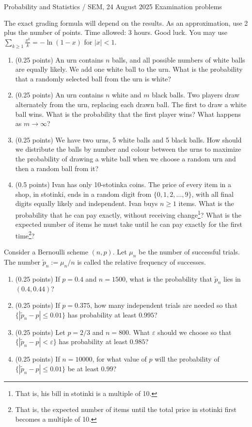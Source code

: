 \documentclass[a4paper]{report}
\begin{document}
\noindent Probability and Statistics / SEM, 24 August 2025 \hfill Examination problems
\hrulefill
\begin{it}
The exact grading formula will depend on the results. As an approximation, use 2 plus the number of points. Time allowed: 3 hours. Good luck.
You may use $\sum_{k\geq1}\frac{x^k}{k}=-\ln(1-x)$ for $|x|<1$.
\end{it}
\begin{problem}
\begin{enumerate}
\item (0.25 points) An urn contains $n$ balls, and all possible numbers of white balls are equally likely. We add one white ball to the urn. What is the probability that a randomly selected ball from the urn is white?
\item (0.25 points) An urn contains $n$ white and $m$ black balls. Two players draw alternately from the urn, replacing each drawn ball. The first to draw a white ball wins. What is the probability that the first player wins? What happens as $m\to\infty$?
\item (0.25 points) We have two urns, 5 white balls and 5 black balls. How should we distribute the balls by number and colour between the urns to maximize the probability of drawing a white ball when we choose a random urn and then a random ball from it?
\item (0.5 points) Ivan has only 10-stotinka coins. The price of every item in a shop, in stotinki, ends in a random digit from $\{0,1,2,\dots,9\}$, with all final digits equally likely and independent. Ivan buys $n\geq1$ items. What is the probability that he can pay exactly, without receiving change\footnote{That is, his bill in stotinki is a multiple of 10.}? What is the expected number of items he must take until he can pay exactly for the first time\footnote{That is, the expected number of items until the total price in stotinki first becomes a multiple of 10.}?
\end{enumerate}
\end{problem}
\begin{problem}
Consider a Bernoulli scheme $(n,p)$. Let $\mu_n$ be the number of successful trials. The number $\tilde p_n:=\mu_n/n$ is called the relative frequency of successes.
\begin{enumerate}
\item (0.25 points) If $p=0.4$ and $n=1500$, what is the probability that $\tilde p_n$ lies in $(0.4,0.44)$?
\item (0.25 points) If $p=0.375$, how many independent trials are needed so that $\{|\tilde p_n-p|\leq0.01\}$ has probability at least $0.995$?
\item (0.25 points) Let $p=2/3$ and $n=800$. What $\varepsilon$ should we choose so that $\{|\tilde p_n-p|<\varepsilon\}$ has probability at least $0.985$?
\item (0.25 points) If $n=10000$, for what value of $p$ will the probability of $\{|\tilde p_n-p|\leq0.01\}$ be at least $0.99$?
\end{enumerate}
\end{problem}
\end{document}
